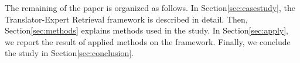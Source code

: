 The remaining of the paper is organized as follows. In Section\ref{sec:casestudy}, the Translator-Expert Retrieval framework is described in detail. Then, Section\ref{sec:methods} explains methods used in the study. In Section\ref{sec:apply}, we report the result of applied methods on the framework. Finally, we conclude the study in Section\ref{sec:conclusion}.
